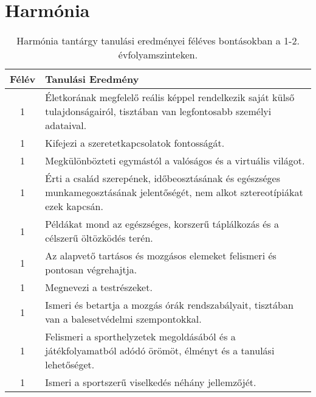         \section{Harmónia}

       
           \begin{longtable}{c | p{12cm} }
            \caption[Harmónia 1-2.]{Harmónia tantárgy tanulási eredményei féléves bontásokban a 1-2. évfolyamszinteken. }  \\

            \textbf{Félév} & \textbf{Tanulási Eredmény} \\
            \hline
            \endhead
                                
                                      
                                
                                          1 &  Életkorának megfelelő reális képpel rendelkezik saját külső tulajdonságairól, tisztában van legfontosabb személyi adataival. \\ \hline
                                          1 &  Kifejezi a szeretetkapcsolatok fontosságát. \\ \hline
                                          1 &  Megkülönbözteti egymástól a valóságos és a virtuális világot. \\ \hline
                                          1 &  Érti a család szerepének, időbeosztásának és egészséges munkamegosztásának jelentőségét, nem alkot sztereotípiákat ezek kapcsán. \\ \hline
                                          1 &  Példákat mond az egészséges, korszerű táplálkozás és a célszerű öltözködés terén. \\ \hline
                                          1 &  Az alapvető tartásos és mozgásos elemeket felismeri és pontosan végrehajtja. \\ \hline
                                          1 &  Megnevezi a testrészeket. \\ \hline
                                          1 &  Ismeri és betartja a mozgás órák rendszabályait, tisztában van a balesetvédelmi szempontokkal. \\ \hline
                                          1 &  Felismeri a sporthelyzetek megoldásából és a játékfolyamatból adódó örömöt, élményt és a tanulási lehetőséget. \\ \hline
                                          1 &  Ismeri a sportszerű viselkedés néhány jellemzőjét. \\ \hline
                                      

\end{longtable}

